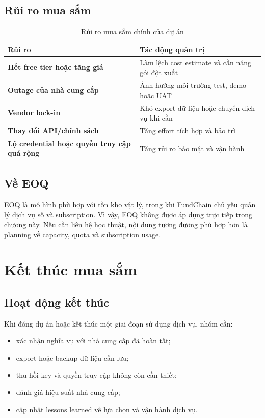 \subsection{Rủi ro mua sắm}

\begin{table}[H]
\centering
\caption{Rủi ro mua sắm chính của dự án}
\label{tab:procurement-risks}
\begin{tabularx}{\textwidth}{| >{\bfseries}p{3.8cm} | X |}
\hline
Rủi ro & Tác động quản trị \\
\hline
Hết free tier hoặc tăng giá & Làm lệch cost estimate và cần nâng gói đột xuất \\ \hline
Outage của nhà cung cấp & Ảnh hưởng môi trường test, demo hoặc UAT \\ \hline
Vendor lock-in & Khó export dữ liệu hoặc chuyển dịch vụ khi cần \\ \hline
Thay đổi API/chính sách & Tăng effort tích hợp và bảo trì \\ \hline
Lộ credential hoặc quyền truy cập quá rộng & Tăng rủi ro bảo mật và vận hành \\
\hline
\end{tabularx}
\end{table}

\subsection{Về EOQ}

EOQ là mô hình phù hợp với tồn kho vật lý, trong khi FundChain chủ yếu quản lý dịch vụ số và subscription. Vì vậy, EOQ không được áp dụng trực tiếp trong chương này. Nếu cần liên hệ học thuật, nội dung tương đương phù hợp hơn là planning về capacity, quota và subscription usage.

\fi
\section{Kết thúc mua sắm}
\iffalse

\subsection{Hoạt động kết thúc}

Khi đóng dự án hoặc kết thúc một giai đoạn sử dụng dịch vụ, nhóm cần:

\begin{itemize}
  \item xác nhận nghĩa vụ với nhà cung cấp đã hoàn tất;
  \item export hoặc backup dữ liệu cần lưu;
  \item thu hồi key và quyền truy cập không còn cần thiết;
  \item đánh giá hiệu suất nhà cung cấp;
  \item cập nhật lessons learned về lựa chọn và vận hành dịch vụ.
\end{itemize}

